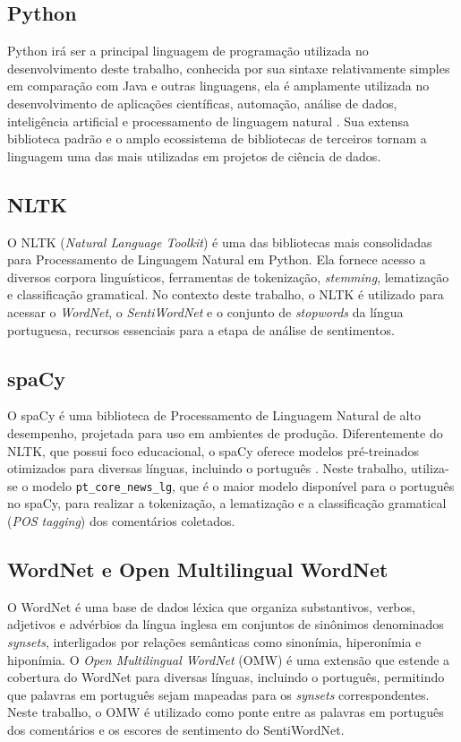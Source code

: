 \documentclass[
	12pt,				%
	openright,			%
	oneside,			%
	a4paper,			%
	english,			%
	brazil				%
	]{abntex2}
\begin{document}
\subsection{Python}
Python irá ser a principal linguagem de programação utilizada no desenvolvimento deste trabalho, conhecida por sua sintaxe relativamente simples em comparação com Java e outras linguagens, ela é amplamente utilizada no desenvolvimento de aplicações científicas, automação, análise de dados, inteligência artificial e processamento de linguagem natural \cite{Lutz2013}. Sua extensa biblioteca padrão e o amplo ecossistema de bibliotecas de terceiros tornam a linguagem uma das mais utilizadas em projetos de ciência de dados.
\subsection{NLTK}
O NLTK (\textit{Natural Language Toolkit}) é uma das bibliotecas mais consolidadas para Processamento de Linguagem Natural em Python. Ela fornece acesso a diversos corpora linguísticos, ferramentas de tokenização, \textit{stemming}, lematização e classificação gramatical. No contexto deste trabalho, o NLTK é utilizado para acessar o \textit{WordNet}, o \textit{SentiWordNet} e o conjunto de \textit{stopwords} da língua portuguesa, recursos essenciais para a etapa de análise de sentimentos.
\subsection{spaCy}
O spaCy é uma biblioteca de Processamento de Linguagem Natural de alto desempenho, projetada para uso em ambientes de produção. Diferentemente do NLTK, que possui foco educacional, o spaCy oferece modelos pré-treinados otimizados para diversas línguas, incluindo o português . Neste trabalho, utiliza-se o modelo \texttt{pt\_core\_news\_lg}, que é o maior modelo disponível para o português no spaCy, para realizar a tokenização, a lematização e a classificação gramatical (\textit{POS tagging}) dos comentários coletados.
\subsection{WordNet e Open Multilingual WordNet}
O WordNet é uma base de dados léxica que organiza substantivos, verbos, adjetivos e advérbios da língua inglesa em conjuntos de sinônimos denominados \textit{synsets}, interligados por relações semânticas como sinonímia, hiperonímia e hiponímia. O \textit{Open Multilingual WordNet} (OMW) é uma extensão que estende a cobertura do WordNet para diversas línguas, incluindo o português, permitindo que palavras em português sejam mapeadas para os \textit{synsets} correspondentes. Neste trabalho, o OMW é utilizado como ponte entre as palavras em português dos comentários e os escores de sentimento do SentiWordNet.
\end{document}
